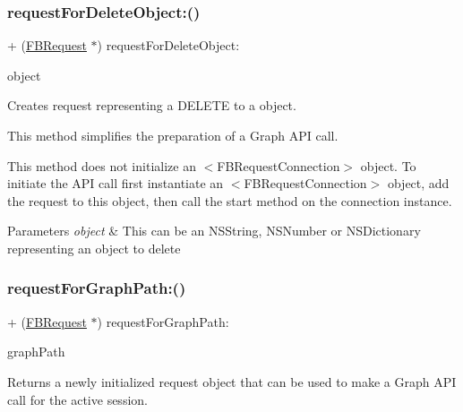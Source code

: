 \subsubsection{\texorpdfstring{request\+For\+Delete\+Object\+:()}{requestForDeleteObject:()}\hspace{0.1cm}{\footnotesize\ttfamily [5/5]}}
{\footnotesize\ttfamily + (\hyperlink{interfaceFBRequest}{F\+B\+Request} $\ast$) request\+For\+Delete\+Object\+: \begin{DoxyParamCaption}\item[{(id)}]{object }\end{DoxyParamCaption}}

Creates request representing a D\+E\+L\+E\+TE to a object.

This method simplifies the preparation of a Graph A\+PI call.

This method does not initialize an $<$\+F\+B\+Request\+Connection$>$ object. To initiate the A\+PI call first instantiate an $<$\+F\+B\+Request\+Connection$>$ object, add the request to this object, then call the {\ttfamily start} method on the connection instance.


\begin{DoxyParams}{Parameters}
{\em object} & This can be an N\+S\+String, N\+S\+Number or N\+S\+Dictionary representing an object to delete \\
\hline
\end{DoxyParams}
\mbox{\label{interfaceFBRequest_a33356f35896b2f50d96ed24c8ddf5841}} 
\subsubsection{\texorpdfstring{request\+For\+Graph\+Path\+:()}{requestForGraphPath:()}\hspace{0.1cm}{\footnotesize\ttfamily [1/5]}}
{\footnotesize\ttfamily + (\hyperlink{interfaceFBRequest}{F\+B\+Request} $\ast$) request\+For\+Graph\+Path\+: \begin{DoxyParamCaption}\item[{(N\+S\+String $\ast$)}]{graph\+Path }\end{DoxyParamCaption}}

Returns a newly initialized request object that can be used to make a Graph A\+PI call for the active session.

